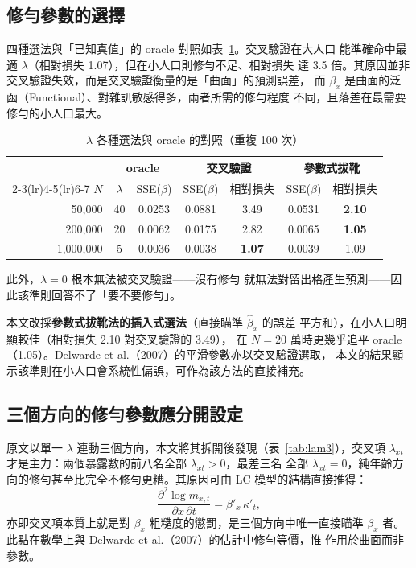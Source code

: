 \documentclass[UTF8, fontset=macnew, a4paper, 12pt]{ctexart}
\begin{document}
\subsection{修勻參數的選擇}

四種選法與「已知真值」的 oracle 對照如表~\ref{tab:lamsel}。交叉驗證在大人口
能準確命中最適 $\lambda$（相對損失 1.07），但在小人口則修勻不足、相對損失
達 3.5 倍。其原因並非交叉驗證失效，而是交叉驗證衡量的是「曲面」的預測誤差，
而 $\beta_x$ 是曲面的泛函（Functional）、對雜訊敏感得多，兩者所需的修勻程度
不同，且落差在最需要修勻的小人口最大。

\begin{table}[H]
\centering
\caption{$\lambda$ 各種選法與 oracle 的對照（重複 100 次）}
\small
\begin{tabular}{rcccccc}
\toprule
& \multicolumn{2}{c}{oracle} & \multicolumn{2}{c}{交叉驗證}
& \multicolumn{2}{c}{參數式拔靴}\\
\cmidrule(lr){2-3}\cmidrule(lr){4-5}\cmidrule(lr){6-7}
$N$ & $\lambda$ & SSE($\beta$) & SSE($\beta$) & 相對損失
    & SSE($\beta$) & 相對損失\\
\midrule
50,000    & 40 & 0.0253 & 0.0881 & 3.49 & 0.0531 & \textbf{2.10}\\
200,000   & 20 & 0.0062 & 0.0175 & 2.82 & 0.0065 & \textbf{1.05}\\
1,000,000 & \phantom{0}5 & 0.0036 & 0.0038 & \textbf{1.07} & 0.0039 & 1.09\\
\bottomrule
\end{tabular}
\label{tab:lamsel}
\end{table}
此外，$\lambda=0$ 根本無法被交叉驗證——沒有修勻
就無法對留出格產生預測——因此該準則回答不了「要不要修勻」。

本文改採\textbf{參數式拔靴法的插入式選法}（直接瞄準 $\hat\beta_x$ 的誤差
平方和），在小人口明顯較佳（相對損失 2.10 對交叉驗證的 3.49），
在 $N=20$ 萬時更幾乎追平 oracle（1.05）。Delwarde et al.（2007）的平滑參數亦以交叉驗證選取，
本文的結果顯示該準則在小人口會系統性偏誤，可作為該方法的直接補充。

\subsection{三個方向的修勻參數應分開設定}

原文以單一 $\lambda$ 連動三個方向，本文將其拆開後發現（表~\ref{tab:lam3}），交叉項
$\lambda_{xt}$ 才是主力：兩個暴露數的前八名全部 $\lambda_{xt}>0$，最差三名
全部 $\lambda_{xt}=0$，純年齡方向的修勻甚至比完全不修勻更糟。其原因可由
LC 模型的結構直接推得：
\begin{equation}
\frac{\partial^2\log m_{x,t}}{\partial x\,\partial t}=\beta'_x\,\kappa'_t,
\end{equation}
亦即交叉項本質上就是對 $\beta_x$ 粗糙度的懲罰，是三個方向中唯一直接瞄準
$\beta_x$ 者。此點在數學上與 Delwarde et al.（2007）的估計中修勻等價，惟
作用於曲面而非參數。
\end{document}
